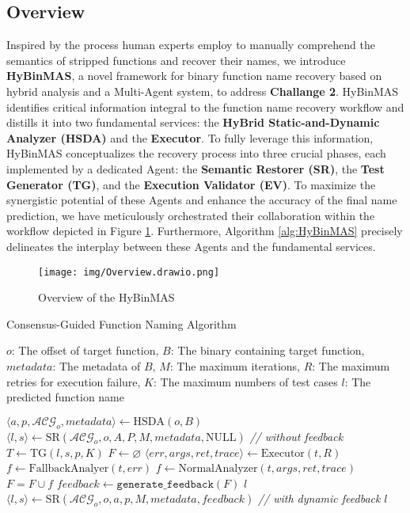\documentclass[acmsmall,screen,review,anonymous]{acmart} %
\begin{document}
\subsection{Overview}
Inspired by the process human experts employ to manually comprehend the semantics of stripped functions and recover their names, we introduce \textbf{HyBinMAS}, a novel framework for binary function name recovery based on hybrid analysis and a Multi-Agent system, to address \textbf{Challange 2}. HyBinMAS identifies critical information integral to the function name recovery workflow and distills it into two fundamental services: the \textbf{HyBrid Static-and-Dynamic Analyzer (HSDA)} and the \textbf{Executor}. To fully leverage this information, HyBinMAS conceptualizes the recovery process into three crucial phases, each implemented by a dedicated Agent: the \textbf{Semantic Restorer (SR)}, the \textbf{Test Generator (TG)}, and the \textbf{Execution Validator (EV)}. To maximize the synergistic potential of these Agents and enhance the accuracy of the final name prediction, we have meticulously orchestrated their collaboration within the workflow depicted in Figure \ref{fig:overview}. Furthermore, Algorithm \ref{alg:HyBinMAS} precisely delineates the interplay between these Agents and the fundamental services.
\begin{figure}[h] %
    \centering
    \texttt{[image: img/Overview.drawio.png]} %
    \caption{Overview of the HyBinMAS} %
    \label{fig:overview} %
\end{figure}
\begin{algorithm}
  \caption{Consensus-Guided Function Naming Algorithm}
  \label{alg:HyBinMAS}
  \begin{algorithmic}[1]
    \REQUIRE $o$: The offset of target function, $B$: The binary containing target function, $metadata$: The metadata of $B$, $M$: The maximum iterations, $R$: The maximum retries for execution failure, $K$: The maximum numbers of test cases
    \ENSURE $l$: The predicted function name

    \STATE $\langle a, p, \mathcal{ACG}_o, metadata \rangle \gets \text{HSDA}(o, B)$
    \STATE $\langle l, s \rangle \gets \text{SR}(\mathcal{ACG}_o, o, A, P, M, metadata, \text{NULL})$ \textit{// without feedback}
        \STATE $T \gets \text{TG}(l, s, p, K)$
        \STATE $F \gets \varnothing$
            \STATE $\langle err, args, ret, trace \rangle \gets \text{Executor}(t, R)$
                \STATE $f \gets \text{FallbackAnalyer}(t, err)$
            \ELSE
                \STATE $f \gets \text{NormalAnalyzer}(t, args, ret, trace)$
            \ENDIF
            \STATE $F = F \cup f $
        \ENDFOR
        \STATE $feedback \gets \texttt{generate\_feedback}(F)$
            \RETURN $l$
        \ENDIF
        \STATE $\langle l, s \rangle \gets \text{SR}(\mathcal{ACG}_o, o, a, p, M, metadata, feedback)$ \textit{// with dynamic feedback}
    \ENDFOR
    \RETURN $l$
  \end{algorithmic}
\end{algorithm}
\end{document}
